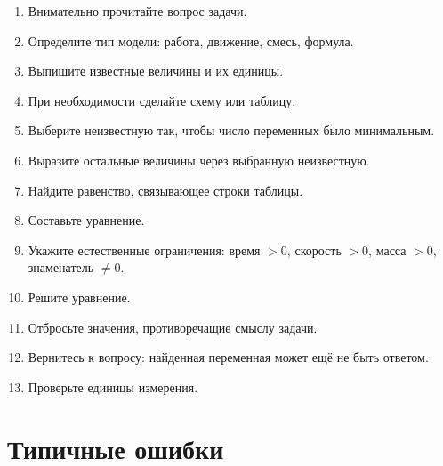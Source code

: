 \documentclass[a4paper,12pt]{article}
\begin{document}
\begin{enumerate}
    \item Внимательно прочитайте вопрос задачи.
    \item Определите тип модели:
    работа, движение, смесь, формула.
    \item Выпишите известные величины и их единицы.
    \item При необходимости сделайте схему или таблицу.
    \item Выберите неизвестную так, чтобы число переменных было минимальным.
    \item Выразите остальные величины через выбранную неизвестную.
    \item Найдите равенство, связывающее строки таблицы.
    \item Составьте уравнение.
    \item Укажите естественные ограничения:
    время \(>0\), скорость \(>0\), масса \(>0\), знаменатель \(\ne0\).
    \item Решите уравнение.
    \item Отбросьте значения, противоречащие смыслу задачи.
    \item Вернитесь к вопросу: найденная переменная может ещё не быть ответом.
    \item Проверьте единицы измерения.
\end{enumerate}


\section{Типичные ошибки}
\end{document}
